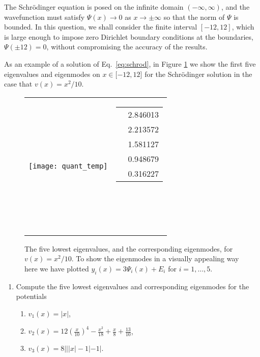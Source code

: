 \documentclass[11pt]{article}
\begin{document}
\begin{enumerate}
    The Schr\"odinger equation is posed on the infinite domain $(-\infty,\infty)$,
    and the wavefunction must satisfy $\Psi(x)\to 0$ as $x\to \pm \infty$ so
    that the norm of $\Psi$ is bounded. In this question, we shall consider the
    finite interval $[-12,12]$, which is large enough to impose zero Dirichlet
    boundary conditions at the boundaries, $\Psi(\pm 12)=0$, without
    compromising the accuracy of the results.

    As an example of a solution of Eq.~\ref{eq:schrod}, in Figure
    \ref{fig:quant} we show the first five eigenvalues and eigenmodes on $x \in
    [−12, 12$] for the Schr\"odinger solution in the case that $v(x) = x^2/10$.

    \begin{figure}
      \begin{center}
	\begin{tabular}{cc}
	  \texttt{[image: quant\_temp]} & \parbox{3cm}{
	\begin{tabular}{|c|c|}
	  \hline
	  $E_5$ & 2.846013 \\
	  $E_4$ & 2.213572 \\
	  $E_3$ & 1.581127 \\
	  $E_2$ & 0.948679 \\
	  $E_1$ & 0.316227 \\
	  \hline
	\end{tabular}\\
	\vspace{8cm}
	\\~\\
	}
      \end{tabular}
      \end{center}
      \vspace{-6cm}
      \caption{The five lowest eigenvalues, and the corresponding eigenmodes,
      for $v(x) = x^2/10$. To show the eigenmodes in a visually appealing way
      here we have plotted $y_i(x) = 3\Psi_i(x) + E_i$ for $i = 1, \ldots ,
      5$.\label{fig:quant}}
    \end{figure}
    \begin{enumerate}
      \item Compute the five lowest eigenvalues and corresponding eigenmodes for
	the potentials
	\begin{enumerate}
	  \item $v_1(x) = |x|$,
	  \item $v_2(x) = 12 \left( \frac{x}{10} \right)^4 - \frac{x^2}{18} + \frac{x}{8} + \frac{13}{10}$,
	  \item $v_3(x) = 8|||x|-1|-1|$.

\end{enumerate}
\end{enumerate}
\end{enumerate}
\end{document}
